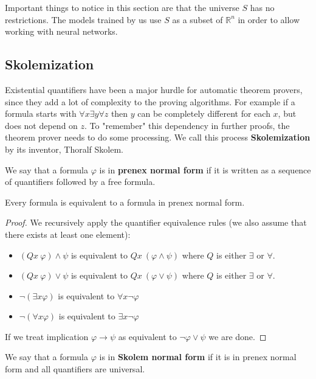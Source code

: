 Important things to notice in this section are that the universe $S$ has no restrictions. The models trained by us use $S$ as a subset of $\mathbb{R}^n$ in order to allow working with neural networks. 

\subsection{Skolemization}
\label{section:skolem}
Existential quantifiers have been a major hurdle for automatic theorem provers, since they add a lot of complexity to the proving algorithms. For example if a formula starts with $\forall x \exists y \forall z$ then $y$ can be completely different for each $x$, but does not depend on $z$. To "remember" this dependency in further proofs, the theorem prover needs to do some processing. We call this process \textbf{Skolemization} by its inventor, Thoralf Skolem.

\begin{defn}
	We say that a formula $\varphi$ is in \textbf{prenex normal form} if it is written as a sequence of quantifiers followed by a free formula.
\end{defn}

\begin{thm}
	Every formula is equivalent to a formula in prenex normal form.
\end{thm}
\begin{proof}
	We recursively apply the quantifier equivalence rules (we also assume that there exists at least one element):
	\begin{itemize}
		\item $(Q x\ \varphi)\wedge\psi$ is equivalent to $Q x\ (\varphi\wedge\psi)$ where $Q$ is either $\exists$ or $\forall$. 
		\item $(Q x\ \varphi)\vee\psi$ is equivalent to $Q x\ (\varphi\vee\psi)$ where $Q$ is either $\exists$ or $\forall$. 
		\item $\neg(\exists x\varphi)$ is equivalent to $\forall x \neg \varphi$
		\item $\neg(\forall x\varphi)$ is equivalent to $\exists x \neg \varphi$
	\end{itemize}
If we treat implication $\varphi \rightarrow \psi$ as equivalent to $\neg \varphi \vee \psi$ we are done.
\end{proof}

\begin{defn}
	We say that a formula $\varphi$ is in \textbf{Skolem normal form} if it is in prenex normal form and all quantifiers are universal.
\end{defn}

